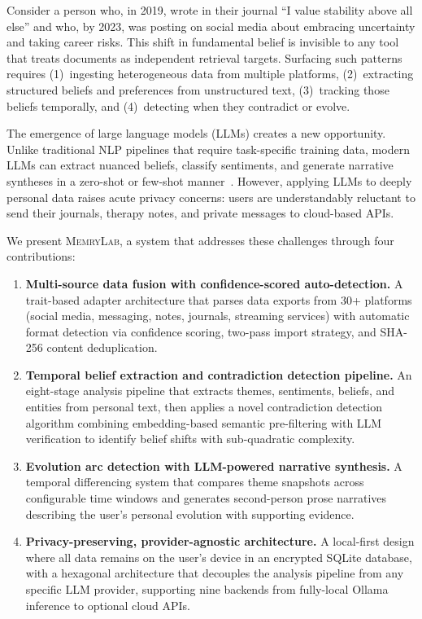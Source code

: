 \documentclass[manuscript,review]{acmart}
\begin{document}
Consider a person who, in 2019, wrote in their journal ``I value stability above all else'' and who, by 2023, was posting on social media about embracing uncertainty and taking career risks.
This shift in fundamental belief is invisible to any tool that treats documents as independent retrieval targets.
Surfacing such patterns requires (1)~ingesting heterogeneous data from multiple platforms, (2)~extracting structured beliefs and preferences from unstructured text, (3)~tracking those beliefs temporally, and (4)~detecting when they contradict or evolve.

The emergence of large language models (LLMs) creates a new opportunity.
Unlike traditional NLP pipelines that require task-specific training data, modern LLMs can extract nuanced beliefs, classify sentiments, and generate narrative syntheses in a zero-shot or few-shot manner~\cite{brown2020gpt3,touvron2023llama}.
However, applying LLMs to deeply personal data raises acute privacy concerns: users are understandably reluctant to send their journals, therapy notes, and private messages to cloud-based APIs.

We present \textsc{MemryLab}, a system that addresses these challenges through four contributions:

\begin{enumerate}
    \item \textbf{Multi-source data fusion with confidence-scored auto-detection.} A trait-based adapter architecture that parses data exports from 30+ platforms (social media, messaging, notes, journals, streaming services) with automatic format detection via confidence scoring, two-pass import strategy, and SHA-256 content deduplication.

    \item \textbf{Temporal belief extraction and contradiction detection pipeline.} An eight-stage analysis pipeline that extracts themes, sentiments, beliefs, and entities from personal text, then applies a novel contradiction detection algorithm combining embedding-based semantic pre-filtering with LLM verification to identify belief shifts with sub-quadratic complexity.

    \item \textbf{Evolution arc detection with LLM-powered narrative synthesis.} A temporal differencing system that compares theme snapshots across configurable time windows and generates second-person prose narratives describing the user's personal evolution with supporting evidence.

    \item \textbf{Privacy-preserving, provider-agnostic architecture.} A local-first design where all data remains on the user's device in an encrypted SQLite database, with a hexagonal architecture that decouples the analysis pipeline from any specific LLM provider, supporting nine backends from fully-local Ollama inference to optional cloud APIs.
\end{enumerate}
\end{document}

